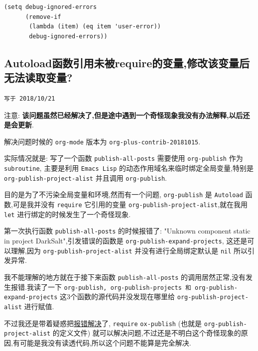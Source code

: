 \documentclass[11pt]{article}
\begin{document}
\begin{verbatim}
(setq debug-ignored-errors
      (remove-if
       (lambda (item) (eq item 'user-error))
       debug-ignored-errors))
\end{verbatim}


\subsection{Autoload函数引用未被require的变量,修改该变量后无法读取变量?}
\label{sec:org17d7844}
\begin{verbatim}
写于 2018/10/21
\end{verbatim}

注意: \textbf{该问题虽然已经解决了,但是途中遇到一个奇怪现象我没有办法解释,以后还是会更新}.

解决问题时候的 \texttt{org-mode} 版本为 \texttt{org-plus-contrib-20181015}.

实际情况就是: 写了一个函数 \texttt{publish-all-posts} 需要使用 \texttt{org-publish} 作为 \texttt{subroutine}, 主要是利用 \texttt{Emacs Lisp} 的动态作用域名来临时绑定全局变量,特别是 \texttt{org-publish-project-alist} 并且调用 \texttt{org-publish}.

目的是为了不污染全局变量和环境,然而有一个问题, \texttt{org-publish} 是 \texttt{Autoload} 函数,可是我并没有 \texttt{require} 它引用的变量 \texttt{org-publish-project-alist},就在我用 \texttt{let} 进行绑定的时候发生了一个奇怪现象.

第一次执行函数 \texttt{publish-all-posts} 的时候报错了: "Unknown component static in project DarkSalt",引发错误的函数是 \texttt{org-publish-expand-projects}, 这还是可以理解,因为 \texttt{org-publish-project-alist} 并没有进行全局绑定默认是 \texttt{nil} 所以引发异常.

我不能理解的地方就在于接下来函数 \texttt{publish-all-posts} 的调用居然正常,没有发生报错.我读了一下 \texttt{org-publish, org-publish-projects 和 org-publish-expand-projects} 这3个函数的源代码并没发现在哪里给 \texttt{org-publish-project-alist} 进行赋值.

不过我还是带着疑惑把\href{https://github.com/saltb0rn/emacs.d/commit/b146dffaa096683e1f1eee171d6e292af719cdb1\#diff-64ed6d0a7a4f2eaf33cacc2454a19cff}{报错解决}了, \texttt{require} \texttt{ox-publish} (也就是 \texttt{org-publish-project-alist} 的定义文件) 就可以解决问题,不过还是不明白这个奇怪现象的原因,有可能是我没有读透代码,所以这个问题不能算是完全解决.
\end{document}

